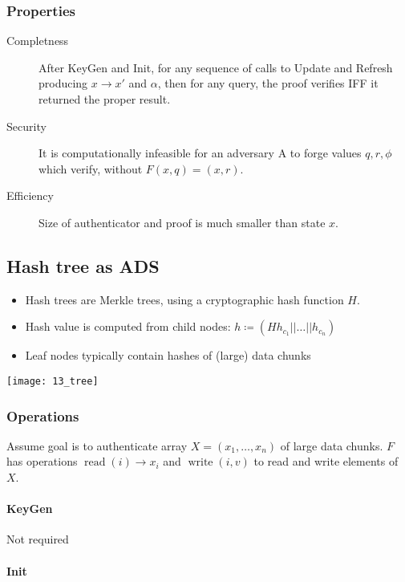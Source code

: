 \subsubsection{Properties}

\begin{description}
		\item[Completness] After KeyGen and Init, for any sequence of calls to
				Update and Refresh producing $x \rightarrow x'$ and $\alpha$,
				then for any query, the proof verifies IFF it returned the
				proper result.
		\item[Security] It is computationally infeasible for an adversary A to
				forge values $q, r, \phi$ which verify, without $F(x, q) = (x,
				r)$.
		\item[Efficiency] Size of authenticator and proof is much smaller than state $x$.
\end{description}

\subsection{Hash tree as ADS}

\begin{itemize}
		\item Hash trees are Merkle trees, using a cryptographic hash function $H$.
		\item Hash value is computed from child nodes: $h \coloneqq(H h_{c_1} || \ldots || h_{c_n})$
		\item Leaf nodes typically contain hashes of (large) data chunks
\end{itemize}

\texttt{[image: 13\_tree]}

\subsubsection{Operations}

Assume goal is to authenticate array $X = (x_1, \ldots, x_n)$ of large data
chunks. $F$ has operations $\operatorname{read}(i) \rightarrow x_i$ and
$\operatorname{write}(i, v)$ to read and write elements of $X$.

\paragraph{KeyGen}

Not required

\paragraph{Init}

